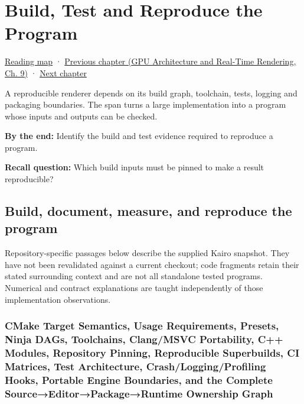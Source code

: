 \chapter{Build, Test and Reproduce the Program}\label{03-visual-computing-i-ch017-build-test-and-reproduce-the-program}\hypertarget{03-visual-computing-i-ch017}{}\label{stagechapter:03-visual-computing-i-ch017}

\hyperref[volume-reading-map]{Reading map} · \href{../06-GPU-Architecture-and-Real-Time-Rendering/main.pdf\#nameddest=03-visual-computing-i-ch016-gpu-memory-divergence-and-execution-order}{Previous chapter (GPU Architecture and Real-Time Rendering, Ch. 9)} · \hyperref[03-visual-computing-i-ch018-c-representation-ownership-and-lifetime]{Next chapter}

A reproducible renderer depends on its build graph, toolchain, tests, logging and packaging boundaries. The span turns a large implementation into a program whose inputs and outputs can be checked.

\textbf{By the end:} Identify the build and test evidence required to reproduce a program.

\textbf{Recall question:} Which build inputs must be pinned to make a result reproducible?

\section{Build, document, measure, and reproduce the program}\label{03-visual-computing-i-ch017-build-document-measure-and-reproduce-the-program}

Repository-specific passages below describe the supplied Kairo snapshot. They have not been revalidated against a current checkout; code fragments retain their stated surrounding context and are not all standalone tested programs. Numerical and contract explanations are taught independently of those implementation observations.

\subsection{CMake Target Semantics, Usage Requirements, Presets, Ninja DAGs, Toolchains, Clang/MSVC Portability, C++ Modules, Repository Pinning, Reproducible Superbuilds, CI Matrices, Test Architecture, Crash/Logging/Profiling Hooks, Portable Engine Boundaries, and the Complete Source→Editor→Package→Runtime Ownership Graph}\label{03-visual-computing-i-ch017-cmake-target-semantics-usage-requirements-presets-ninja-dags-toolchains-clangmsvc-portability-c-modules-repository-pinning-reproducible-superbuilds-ci-matrices-test-architecture-crashloggingprofiling-hooks-portable-engine-boundaries-and-the-complete-sourceeditorpackageruntime-ownership-graph}

